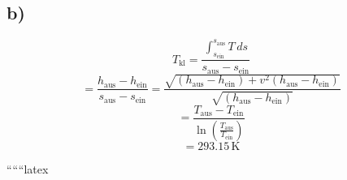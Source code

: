 

\subsection*{b)}
\[
T_{\text{kl}} = \frac{\int_{s_{\text{ein}}}^{s_{\text{aus}}} T \, ds}{s_{\text{aus}} - s_{\text{ein}}}
\]
\[
= \frac{h_{\text{aus}} - h_{\text{ein}}}{s_{\text{aus}} - s_{\text{ein}}} = \frac{\sqrt{(h_{\text{aus}} - h_{\text{ein}}) + v^2 (h_{\text{aus}} - h_{\text{ein}})}}{\sqrt{(h_{\text{aus}} - h_{\text{ein}})}}
\]
\[
= \frac{T_{\text{aus}} - T_{\text{ein}}}{\ln \left( \frac{T_{\text{aus}}}{T_{\text{ein}}} \right)}
\]
\[
= 293.15 \, \text{K}
\]

``````latex